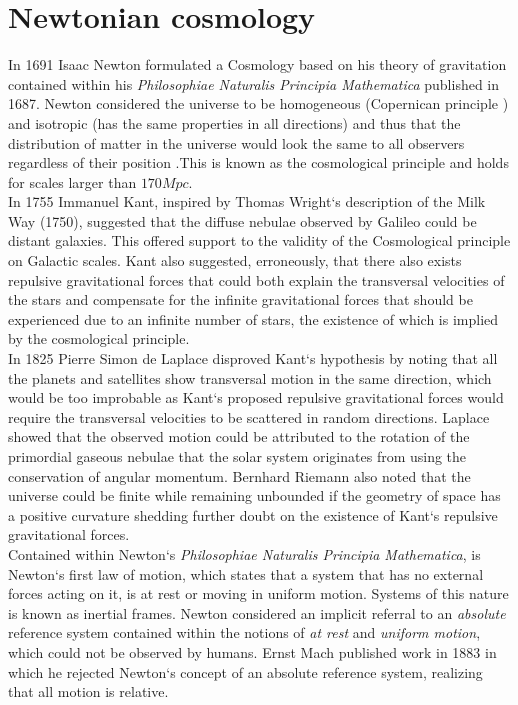 \documentclass[a4paper, 11pt]{FSKH_623_Report}
\numberwithin{equation}{section}
\begin{document}
\section{Newtonian cosmology}
In 1691 Isaac Newton formulated a Cosmology based on his theory of gravitation contained within his \textit{Philosophiae Naturalis Principia Mathematica} published in 1687.\citep{ITC}
Newton considered the universe to be homogeneous (Copernican principle \citep{calcagni2017classical}) and isotropic (has the same properties in all directions) and thus that the distribution of matter in the universe would look the same to all observers regardless of their position \citep{ITC}.This is known as the cosmological principle and holds for scales larger than $170Mpc$\citep{ITC}.\\
In 1755 Immanuel Kant, inspired by Thomas Wright`s description of the Milk Way (1750), suggested that the diffuse nebulae observed by Galileo could be distant galaxies\citep{ITC}. This offered support to the validity of the Cosmological principle on Galactic scales. Kant also suggested, erroneously, that there also exists repulsive gravitational forces that could both explain the transversal velocities of the stars and compensate for the infinite gravitational forces that should be experienced due to an infinite number of stars, the existence of which is implied by the cosmological principle. \\
In 1825 Pierre Simon de Laplace disproved Kant`s hypothesis by noting that all the planets and satellites show transversal motion in the same direction, which would be too improbable as Kant`s proposed repulsive gravitational forces would require the transversal velocities to be scattered in random directions\citep{ITC}. Laplace showed that the observed motion could be attributed to the rotation of the primordial gaseous nebulae that the solar system originates from using the conservation of angular momentum. Bernhard Riemann also noted that the universe could be finite while remaining unbounded if the geometry of space has a positive curvature shedding further doubt on the existence of Kant`s repulsive gravitational forces.\\
Contained within Newton`s \textit{Philosophiae Naturalis Principia Mathematica}, is Newton`s first law of motion, which states that a system that has no external forces acting on it, is at rest or moving in uniform motion. Systems of this nature is known as inertial frames. Newton considered an implicit referral to an \textit{absolute} reference system contained within the notions of \textit{at rest} and \textit{uniform motion}, which could not be observed by humans. Ernst Mach published work in 1883 in which he rejected Newton`s concept of an absolute reference system, realizing that all motion is relative\citep{ITC}. \\ 
\end{document}
